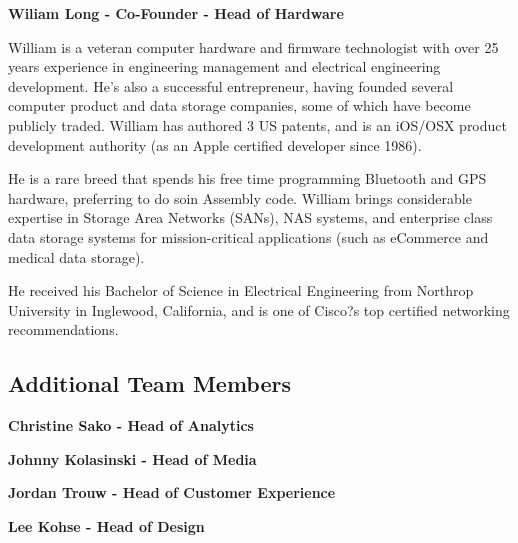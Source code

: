 \documentclass{article}
\begin{document}
\begin {framed}
\begin {center}
\textbf{Wiliam Long - Co-Founder - Head of Hardware}\par
\end {center}
William is a veteran computer hardware and firmware technologist with over 25 years experience in engineering management and electrical engineering development. He's also a successful entrepreneur, having founded several computer product and data storage companies, some of which have become publicly traded. William has authored 3 US patents, and is an iOS/OSX product development authority (as an Apple certified developer since 1986).

He is a rare breed that spends his free time programming Bluetooth and GPS hardware, preferring to do soin Assembly code. William brings considerable expertise in Storage Area Networks (SANs), NAS systems, and enterprise class data storage systems for mission-critical applications (such as eCommerce and medical data storage).

He received his Bachelor of Science in Electrical Engineering from Northrop University in Inglewood, California, and is one of Cisco?s top certified networking recommendations.

\end {framed}

\subsection{Additional Team Members}
\begin {framed}
\begin {center}
\textbf{Christine Sako - Head of Analytics}
\end {center}
\end {framed}

\begin {framed}
\begin {center}
\textbf{Johnny Kolasinski - Head of Media}
\end {center}
\end {framed}

\begin {framed}
\begin {center}
\textbf{Jordan Trouw - Head of Customer Experience}
\end {center}
\end {framed}

\begin {framed}
\begin {center}
\textbf{Lee Kohse - Head of Design}
\end {center}
\end {framed}
\end{document}
